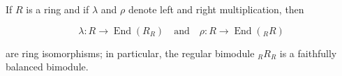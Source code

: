 If $R$ is a ring and if $\lambda$ and $\rho$ denote left and right multiplication, then

$$\lambda: R \rightarrow \operatorname{End}(R_R) \quad \text{and} \quad \rho: R \rightarrow \operatorname{End}(_R R)$$

are ring isomorphisms; in particular, the regular bimodule $_R R_R$ is a faithfully balanced bimodule.
